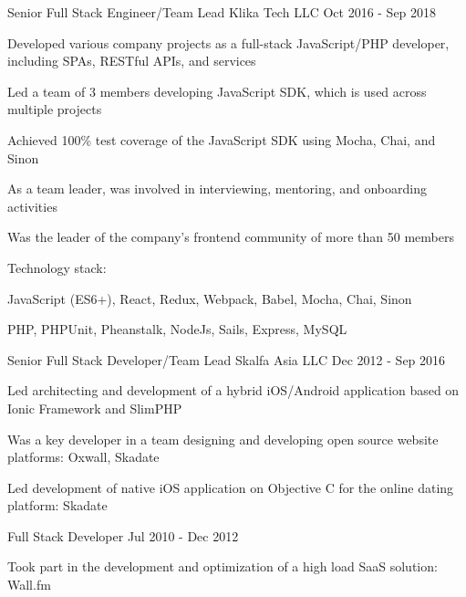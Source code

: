 \begin{cventries}
  \cventry
    {Senior Full Stack Engineer/Team Lead} %
    {Klika Tech LLC} %
    {} %
    {Oct 2016 - Sep 2018} %
    {
      \begin{cvitems}
        \item Developed various company projects as a full-stack JavaScript/PHP developer, including SPAs, RESTful APIs, and services
        \item Led a team of 3 members developing JavaScript SDK, which is used across multiple projects
        \item Achieved 100\% test coverage of the JavaScript SDK using Mocha, Chai, and Sinon
        \item As a team leader, was involved in interviewing, mentoring, and onboarding activities
        \item Was the leader of the company's frontend community of more than 50 members
      \end{cvitems}
      \vspace{5mm}
      Technology stack:
      \begin{cvstackitems}
        \item JavaScript (ES6+), React, Redux, Webpack, Babel, Mocha, Chai, Sinon
        \item PHP, PHPUnit, Pheanstalk, NodeJs, Sails, Express, MySQL
      \end{cvstackitems}
      \vspace{-2.0mm}
    }

  \newpage

  \cventry
    {Senior Full Stack Developer/Team Lead} %
    {Skalfa Asia LLC} %
    {} %
    {Dec 2012 - Sep 2016} %
    {
      \begin{cvitems}
        \item Led architecting and development of a hybrid iOS/Android application based on Ionic Framework and SlimPHP
        \item Was a key developer in a team designing and developing open source website platforms: Oxwall, Skadate
        \item Led development of native iOS application on Objective C for the online dating platform: Skadate
      \end{cvitems}
    }

  \cventry
    {Full Stack Developer} %
    {} %
    {} %
    {Jul 2010 - Dec 2012} %
    {
      \begin{cvitems}
        \item Took part in the development and optimization of a high load SaaS solution: Wall.fm
      \end{cvitems}
    }


\end{cventries}
